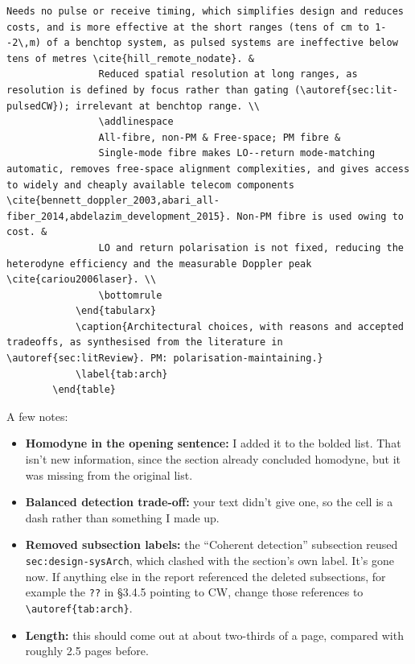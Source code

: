 \begin{tcolorbox}[breakable, colback=gray!4, colframe=gray!50,
	boxrule=0.4pt, arc=2pt, fontupper=\small,
	left=6pt, right=6pt, top=4pt, bottom=4pt]
\begin{lstlisting}[style=airesponse]
				Needs no pulse or receive timing, which simplifies design and reduces costs, and is more effective at the short ranges (tens of cm to 1--2\,m) of a benchtop system, as pulsed systems are ineffective below tens of metres \cite{hill_remote_nodate}. &
				Reduced spatial resolution at long ranges, as resolution is defined by focus rather than gating (\autoref{sec:lit-pulsedCW}); irrelevant at benchtop range. \\
				\addlinespace
				All-fibre, non-PM & Free-space; PM fibre &
				Single-mode fibre makes LO--return mode-matching automatic, removes free-space alignment complexities, and gives access to widely and cheaply available telecom components \cite{bennett_doppler_2003,abari_all-fiber_2014,abdelazim_development_2015}. Non-PM fibre is used owing to cost. &
				LO and return polarisation is not fixed, reducing the heterodyne efficiency and the measurable Doppler peak \cite{cariou2006laser}. \\
				\bottomrule
			\end{tabularx}
			\caption{Architectural choices, with reasons and accepted tradeoffs, as synthesised from the literature in \autoref{sec:litReview}. PM: polarisation-maintaining.}
			\label{tab:arch}
		\end{table}
	\end{lstlisting}
	
	A few notes:
	\begin{itemize}
		\item \textbf{Homodyne in the opening sentence:} I added it to the bolded list. That isn't new information, since the section already concluded homodyne, but it was missing from the original list.
		\item \textbf{Balanced detection trade-off:} your text didn't give one, so the cell is a dash rather than something I made up.
		\item \textbf{Removed subsection labels:} the ``Coherent detection'' subsection reused \texttt{sec:design-sysArch}, which clashed with the section's own label. It's gone now. If anything else in the report referenced the deleted subsections, for example the \texttt{??} in \S3.4.5 pointing to CW, change those references to \texttt{\textbackslash autoref\{tab:arch\}}.
		\item \textbf{Length:} this should come out at about two-thirds of a page, compared with roughly 2.5 pages before.
	\end{itemize}
\end{tcolorbox}

